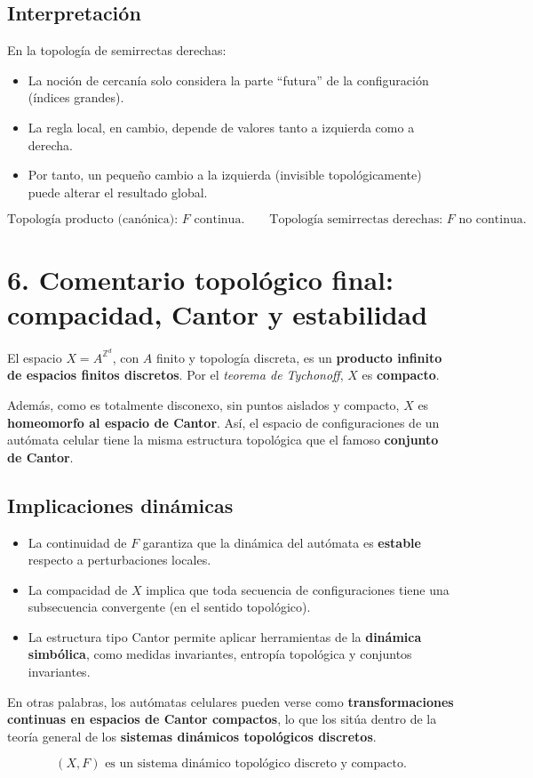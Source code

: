 \documentclass[12pt]{article}
\begin{document}
\subsection*{Interpretación}

En la topología de semirrectas derechas:
\begin{itemize}
  \item La noción de cercanía solo considera la parte ``futura'' de la configuración (índices grandes).
  \item La regla local, en cambio, depende de valores tanto a izquierda como a derecha.
  \item Por tanto, un pequeño cambio a la izquierda (invisible topológicamente) puede alterar el resultado global.
\end{itemize}

\[
\boxed{
\text{Topología producto (canónica): } F \text{ continua.}
\qquad
\text{Topología semirrectas derechas: } F \text{ no continua.}
}
\]

\bigskip

\section*{6. Comentario topológico final: compacidad, Cantor y estabilidad}

El espacio $X = A^{\mathbb{Z}^d}$, con $A$ finito y topología discreta, es un \textbf{producto infinito de espacios finitos discretos}.  
Por el \textit{teorema de Tychonoff}, $X$ es \textbf{compacto}.

Además, como es totalmente disconexo, sin puntos aislados y compacto, $X$ es \textbf{homeomorfo al espacio de Cantor}.  
Así, el espacio de configuraciones de un autómata celular tiene la misma estructura topológica que el famoso \textbf{conjunto de Cantor}.

\subsection*{Implicaciones dinámicas}

\begin{itemize}
  \item La continuidad de $F$ garantiza que la dinámica del autómata es \textbf{estable} respecto a perturbaciones locales.
  \item La compacidad de $X$ implica que toda secuencia de configuraciones tiene una subsecuencia convergente (en el sentido topológico).
  \item La estructura tipo Cantor permite aplicar herramientas de la \textbf{dinámica simbólica}, como medidas invariantes, entropía topológica y conjuntos invariantes.
\end{itemize}

En otras palabras, los autómatas celulares pueden verse como \textbf{transformaciones continuas en espacios de Cantor compactos}, lo que los sitúa dentro de la teoría general de los \textbf{sistemas dinámicos topológicos discretos}.

\[
\boxed{
(X,F) \text{ es un sistema dinámico topológico discreto y compacto.}
}
\]
\end{document}
